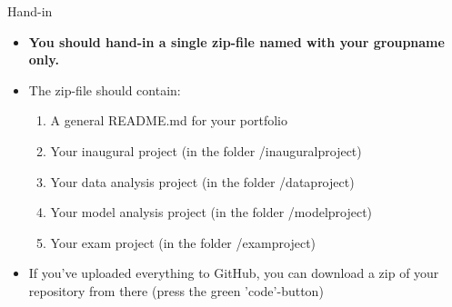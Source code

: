 \documentclass[10pt,english,t,aspectratio=169]{beamer}
\begin{document}
%
\begin{frame}{Hand-in}
\begin{itemize}
\item \textbf{You should hand-in a single zip-file named with your groupname
only.}
\item The zip-file should contain:
\begin{enumerate}
\item A general README.md for your portfolio
\item Your inaugural project (in the folder /inauguralproject)
\item Your data analysis project (in the folder /dataproject)
\item Your model analysis project (in the folder /modelproject)
\item Your exam project (in the folder /examproject)
\end{enumerate}
\item If you've uploaded everything to GitHub, you can download a zip of your repository from there (press the green 'code'-button)
\end{itemize}
\end{frame}
%
\end{document}
